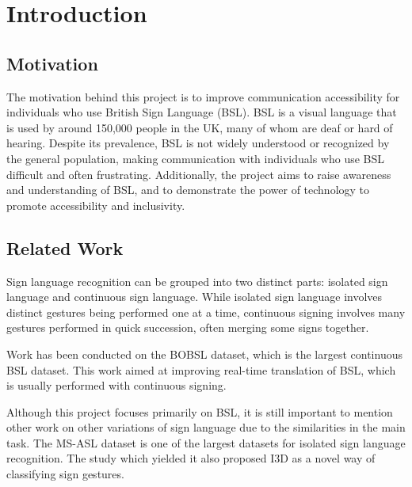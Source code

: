 \documentclass[final,dissertation.tex]{subfiles}
\begin{document}
\chapter{Introduction}

\section{Motivation}

The motivation behind this project is to improve communication accessibility for individuals who use British Sign Language (BSL). BSL is a visual language that is used by around 150,000 people in the UK, many of whom are deaf or hard of hearing. Despite its prevalence, BSL is not widely understood or recognized by the general population, making communication with individuals who use BSL difficult and often frustrating. Additionally, the project aims to raise awareness and understanding of BSL, and to demonstrate the power of technology to promote accessibility and inclusivity.

\section{Related Work}

Sign language recognition can be grouped into two distinct parts: isolated sign language and continuous sign language. While isolated sign language involves distinct gestures being performed one at a time, continuous signing involves many gestures performed in quick succession, often merging some signs together.

Work has been conducted on the BOBSL\cite{albanie2021bbc} dataset, which is the largest continuous BSL dataset. This work aimed at improving real-time translation of BSL, which is usually performed with continuous signing.

Although this project focuses primarily on BSL, it is still important to mention other work on other variations of sign language due to the similarities in the main task. The MS-ASL dataset is one of the largest datasets for isolated sign language recognition. The study which yielded it also proposed I3D as a novel way of classifying sign gestures.
\end{document}
